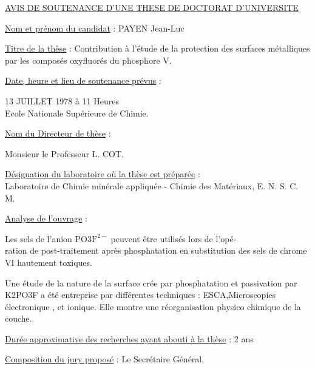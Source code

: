 \uline{AVIS DE SOUTENANCE D'UNE THESE DE DOCTORAT D'UNIVERSITE}

\uline{Nom et prénom du candidat} : PAYEN Jean-Luc

\uline{Titre de la thèse} : Contribution à l'étude de la protection des surfaces métalliques par les composés oxyfluorés du phosphore V.

\uline{Date, heure et lieu de soutenance prévus} :

13 JUILLET 1978 à 11 Heures\\
Ecole Nationale Supérieure de Chimie.

\uline{Nom du Directeur de thèse} :

Monsieur le Professeur L. COT.

\uline{Désignation du laboratoire où la thèse est préparée} :\\
Laboratoire de Chimie minérale appliquée - Chimie des Matériaux, E. N. S. C. M.

\uline{Analyse de l'ouvrage} :

Les sels de l'anion $\mathrm{PO3F}^{2-}$ peuvent être utilisés lors de l'opé-\\
ration de post-traitement après phosphatation en substitution des sels de chrome VI hautement toxiques.

Une étude de la nature de la surface crée par phosphatation et passivation par K2PO3F a été entreprise par différentes techniques : ESCA,Microscopies électronique , et ionique. Elle montre une réorganisation physico chimique de la couche.

\uline{Durée approximative des recherches ayant abouti à la thèse} : 2 ans

\uline{Composition du jury proposé} :
Le Secrétaire Général,

